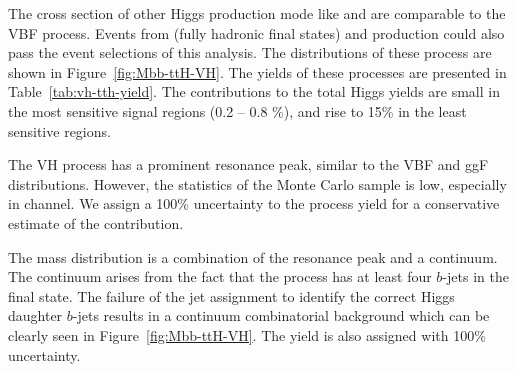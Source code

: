 The cross section of other Higgs production mode like \VH and \ttH are comparable to
the VBF process. Events from \VH (fully hadronic final states) and \ttH production could 
also pass the event selections of this analysis. The \Mbb distributions of these process
 are shown in Figure~\ref{fig:Mbb-ttH-VH}. The yields of these processes are presented 
in Table~\ref{tab:vh-tth-yield}.  The contributions to the total Higgs yields are  small 
in the most sensitive signal regions (0.2 -- 0.8 \%),  and rise to 15\% in the least sensitive regions.  

The VH process has a prominent resonance peak, similar to the VBF and ggF distributions. However, 
the statistics of the Monte Carlo sample is low, especially in \twocentral channel. 
We assign a 100\% uncertainty to the \VH process yield for a conservative estimate of 
the \VH contribution. %

The \ttH mass distribution is a combination of the resonance peak and a continuum. 
The continuum arises from the fact that the \ttH process has at least four $b$-jets in the final state.
The failure of the jet assignment to identify the correct Higgs daughter $b$-jets results in a 
continuum combinatorial background which can be clearly seen in Figure~\ref{fig:Mbb-ttH-VH}. 
The yield is also assigned with 100\% uncertainty.



